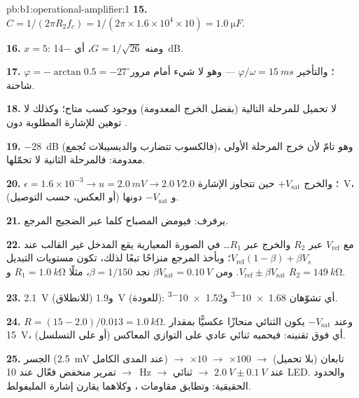\begin{solution}{pb:b1:operational-amplifier:1}
\textbf{15.} $C = 1/(2\pi R_2f_c) = 1/(2\pi \times 1.6\times10^4 \times 10)
= \qty{1.0}{\micro F}$.

\textbf{16.} $x = 5$: ومنه $G = 1/\sqrt{26}$، أي \qty{-14}{dB}.

\textbf{17.} $\varphi = -\arctan 0.5 = -27^\circ$؛ والتأخير $\varphi/\omega =
\qty{15}{ms}$ --- وهو لا شيء أمام مرور شاحنة.

\textbf{18.} لا تحميل للمرحلة التالية (بفضل  الخرج المعدومة)
ووجود كسب متاح؛ وكذلك لا توهين للإشارة المطلوبة دون
.

\textbf{19.} \qty{-28}{dB} (فالكسوب تتضارب والديسيبلات تُجمع)، وهو تامّ لأن
 خرج المرحلة الأولى معدومة: فالمرحلة الثانية لا
تحمّلها.

\textbf{20.} $\epsilon = 1.6\times10^{-3} \to u = \qty{2.0}{mV} \to
\qty{2.0}{V}$؛ والخرج $+V_{\mathrm{sat}}$ حين تتجاوز الإشارة
\qty{2.0}{V}، و $-V_{\mathrm{sat}}$ دونها (أو العكس، حسب التوصيل).

\textbf{21.} يرفرف: فيومض المصباح كلما عبر الضجيج
المرجع.

\textbf{22.} مع $V_{\mathrm{ref}}$ عبر $R_2$ والخرج عبر
$R_1$\dots{} في الصورة المعيارية يقع المدخل غير القالب عند
$V_{\mathrm{ref}}(1 - \beta) + \beta V_s$؛ وبأخذ المرجع منزاحًا
تبعًا لذلك، تكون مستويات التبديل $V_{\mathrm{ref}} \pm \beta V_{\mathrm{sat}}$.
ومن $\beta V_{\mathrm{sat}} = \qty{0.10}{V}$ نجد $\beta = 1/150$، مثلًا $R_1 =
\qty{1.0}{k\ohm}$ و $R_2 = \qty{149}{k\ohm}$.

\textbf{23.} \qty{2.1}{V} (للانطلاق) و\qty{1.9}{V} (للعودة): أي تشوّهان
\num{1.68e-3} و\num{1.52e-3}.

\textbf{24.} $R = (15 - 2.0)/0.013 = \qty{1.0}{k\ohm}$. وعند
$-V_{\mathrm{sat}}$ يكون الثنائي منحازًا عكسيًّا بمقدار \qty{15}{V}، أي فوق
تقنينه: فيحميه ثنائي عادي على التوازي المعاكس (أو على التسلسل).

\textbf{25.} الجسر (\qty{2.5}{mV} عند المدى الكامل) $\to$ تابعان (بلا
تحميل) $\to$  $\times100$ $\to$ 
$\times10$ $\to$ تمرير منخفض فعّال عند \qty{10}{Hz} $\to$  عند
$\qty{2.0}{V} \pm \qty{0.1}{V}$ $\to$ ثنائي LED. والحدود الحقيقية:  وتطابق مقاومات ، وكلاهما يقارن إشارة المليفولط.
\end{solution}
